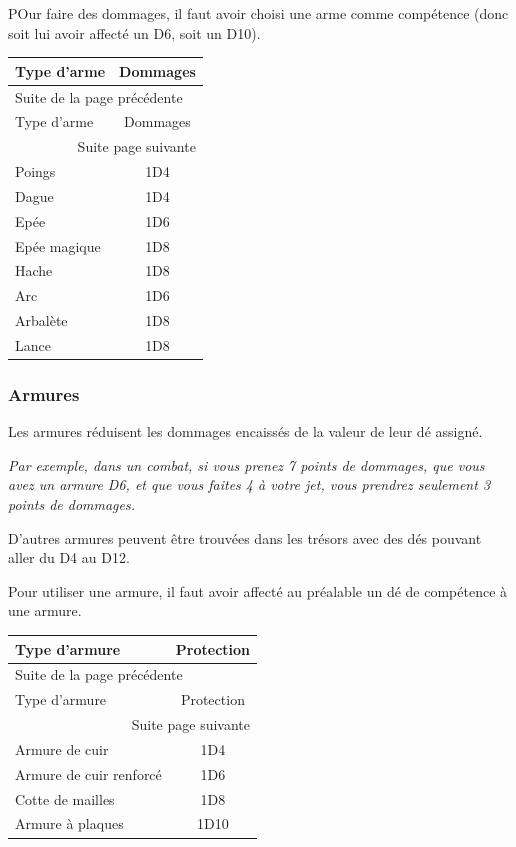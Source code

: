 \documentclass[a4paper, 11pt, twoside]{article}
\begin{document}
POur faire des dommages, il faut avoir choisi une arme comme compétence (donc soit lui avoir affecté un D6, soit un D10).

\begin{longtable}{l|c}
Type d'arme & Dommages\\
\hline
\endfirsthead
\multicolumn{2}{l}{Suite de la page précédente} \\
\hline

Type d'arme & Dommages \\

\hline
\endhead
\hline\multicolumn{2}{r}{Suite page suivante} \\
\endfoot
\endlastfoot
\hline
Poings & 1D4\\
Dague & 1D4\\
Epée & 1D6\\
Epée magique & 1D8\\
Hache & 1D8\\
Arc & 1D6\\
Arbalète & 1D8\\
Lance & 1D8\\
\end{longtable}

\subsubsection{Armures}
\label{sec:org73c6c50}

Les armures réduisent les dommages encaissés de la valeur de leur dé assigné.

\emph{Par exemple, dans un combat, si vous prenez 7 points de dommages, que vous avez un armure D6, et que vous faites 4 à votre jet, vous prendrez seulement 3 points de dommages.}

D'autres armures peuvent être trouvées dans les trésors avec des dés pouvant aller du D4 au D12.

Pour utiliser une armure, il faut avoir affecté au préalable un dé de compétence à une armure.

\begin{longtable}{l|c}
Type d'armure & Protection\\
\hline
\endfirsthead
\multicolumn{2}{l}{Suite de la page précédente} \\
\hline

Type d'armure & Protection \\

\hline
\endhead
\hline\multicolumn{2}{r}{Suite page suivante} \\
\endfoot
\endlastfoot
\hline
Armure de cuir & 1D4\\
Armure de cuir renforcé & 1D6\\
Cotte de mailles & 1D8\\
Armure à plaques & 1D10\\
\end{longtable}
\end{document}
